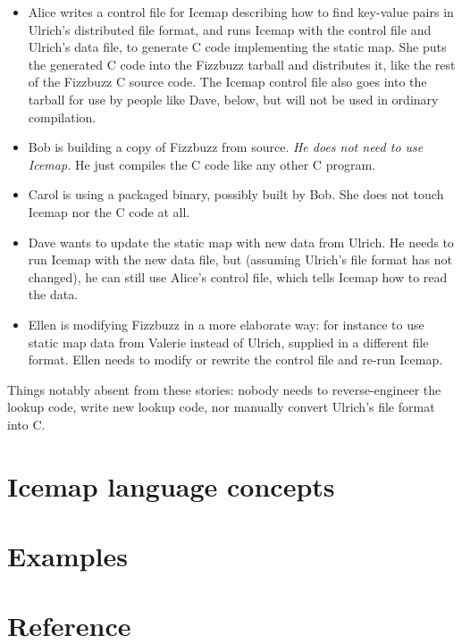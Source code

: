 \documentclass{mitsuba}
\begin{document}
\begin{itemize}
  \item Alice writes a control file for Icemap describing how to find
    key-value pairs in Ulrich's distributed file format, and runs Icemap with
    the control file and Ulrich's data file, to generate C code implementing
    the static map.  She puts the generated C code into the Fizzbuzz tarball
    and distributes it, like the rest of the Fizzbuzz C source code. 
    The Icemap control file also goes into the tarball for use by people
    like Dave, below, but will not be used in ordinary compilation.
  \item Bob is building a copy of Fizzbuzz from source.  \emph{He
    does not need to use Icemap.}  He just compiles the C code like any
    other C program.
  \item Carol is using a packaged binary, possibly built by Bob.  She does
    not touch Icemap nor the C code at all.
  \item Dave wants to update the static map with new data from Ulrich.  He
    needs to run Icemap with the new data file, but (assuming Ulrich's file
    format has not changed), he can still use Alice's control file, which
    tells Icemap how to read the data.
  \item Ellen is modifying Fizzbuzz in a more elaborate way:  for instance
    to use static map data from Valerie instead of Ulrich, supplied in a
    different file format.  Ellen needs to modify or rewrite the control
    file and re-run Icemap.
\end{itemize}

Things notably absent from these stories:  nobody needs to reverse-engineer
the lookup code, write new lookup code, nor manually convert Ulrich's file
format into C.


\chapter{Icemap language concepts}


\chapter{Examples}


\chapter{Reference}

\end{document}
